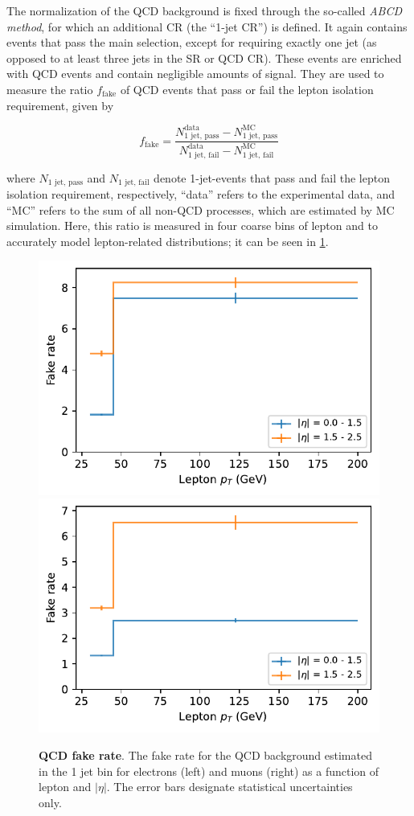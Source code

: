 The normalization of the QCD background is fixed through the so-called \textit{ABCD method}, for which an additional CR (the ``1-jet CR'') is defined.
It again contains events that pass the main selection, except for requiring exactly one jet (as opposed to at least three jets in the SR or QCD CR). These events are enriched with QCD events and contain negligible amounts of \ttbar signal. They are used to measure the ratio $f_{\mathrm{fake}}$ of QCD events that pass or fail the lepton isolation requirement, given by

\begin{equation}
\label{eq:ttxs:abcd_fakerate}
    f_{\mathrm{fake}} = \frac{ N_{\text{1 jet, pass}}^{\text{data}} - N_{\text{1 jet, pass}}^{\text{MC}} }{ N_{\text{1 jet, fail}}^{\text{data}} - N_{\text{1 jet, fail}}^{\text{MC}} }
\end{equation}

where $N_{\text{1 jet, pass}}$ and $N_{\text{1 jet, fail}}$ denote 1-jet-events that pass and fail the lepton isolation requirement, respectively, ``data'' refers to the experimental data, and ``MC'' refers to the sum of all non-QCD processes, which are estimated by MC simulation. Here, this ratio is measured in four coarse bins of lepton \pt and \abseta to accurately model lepton-related distributions; it can be seen in \cref{fig:ttxs:fakerate}.

\begin{figure}[!ht]
    \centering
    \includegraphics[width=0.49 \textwidth]{figures/ttxs/np_plots_run3/fakerate_eles.pdf}
    \hfill
    \includegraphics[width=0.49 \textwidth]{figures/ttxs/np_plots_run3/fakerate_muons.pdf}
    \caption{\textbf{QCD fake rate}. The fake rate for the QCD background estimated in the 1 jet bin for electrons (left) and muons (right) as a function of lepton \pt and $|\eta|$. The error bars designate statistical uncertainties only.}
    \label{fig:ttxs:fakerate}
\end{figure}

